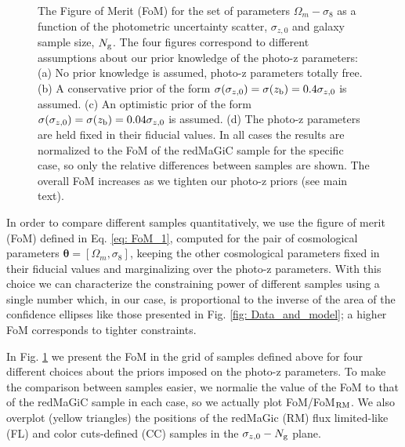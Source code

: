 \documentclass[a4paper,fleqn,usenatbib]{mnras}
\begin{document}
\begin{figure*}
\centering
{}%

\caption{The Figure of Merit (FoM) for the set of parameters $\Omega_m - \sigma_8$ as a function of the photometric uncertainty scatter, $\sigma_{z,0}$ and galaxy sample size, $N_{\mbox{\scriptsize{g}}}$. The four figures correspond to different assumptions about our prior knowledge of the photo-z parameters: (a) No prior knowledge is assumed, photo-z parameters totally free. (b) A conservative prior of the form $\sigma(\sigma_{z,0}) = \sigma(z_{\mbox{\scriptsize{b}}}) = 0.4\sigma_{z,0}$ is assumed. (c) An optimistic prior of the form $\sigma(\sigma_{z,0}) = \sigma(z_{\mbox{\scriptsize{b}}}) = 0.04\sigma_{z,0}$ is assumed. (d) The photo-z parameters are held fixed in their fiducial values. In all cases the results are normalized to the FoM of the redMaGiC sample for the specific case, so only the relative differences between samples are shown. The overall FoM increases as we tighten our photo-z  priors (see main text).}
\label{fig: Baseline}
\end{figure*}

In order to compare different samples quantitatively, we use the figure of merit (FoM) defined in Eq. \eqref{eq: FoM_1}, computed for the pair of cosmological parameters $\mathbf{\theta} =[ \Omega_m, \sigma_8]$, keeping the other cosmological parameters fixed in their fiducial values and marginalizing over the photo-z parameters. With this choice we can characterize the constraining power of different samples using a single number which, in our case, is proportional to the inverse of the area of the confidence ellipses like those presented in Fig. \ref{fig: Data_and_model}; a higher FoM corresponds to tighter constraints.

In Fig. \ref{fig: Baseline} we present the FoM in the grid of samples defined above for four different choices about the priors imposed on the photo-z parameters. To make the comparison between samples easier, we normalie the value of the FoM to that of the redMaGiC sample in each case, so we actually plot FoM/FoM$_{\mbox{\scriptsize{RM}}}$. We also overplot (yellow triangles) the positions of the redMaGic (RM) flux limited-like (FL) and color cuts-defined (CC) samples in the $\sigma_{z,0} - N_{\mbox{\scriptsize{g}}} $ plane. 
\end{document}
